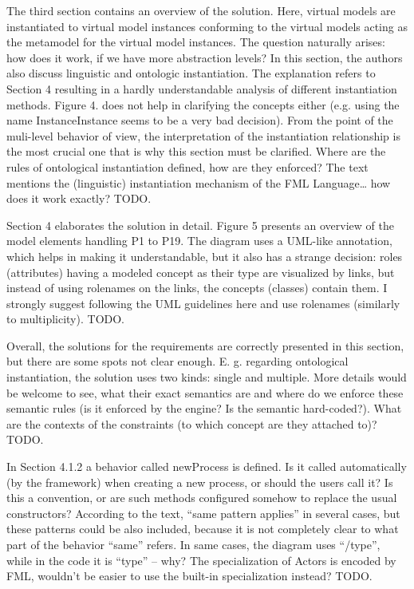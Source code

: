 \documentclass[10pt]{article}
\begin{document}
\begin{response}{The third section contains an overview of the solution. Here, virtual models are instantiated to virtual model instances conforming to the virtual models acting as the metamodel for the virtual model instances. The question naturally arises: how does it work, if we have more abstraction levels?  In this section, the authors also discuss linguistic and ontologic instantiation. The explanation refers to Section 4 resulting in a hardly understandable analysis of different instantiation methods. Figure 4. does not help in clarifying the concepts either (e.g. using the name InstanceInstance seems to be a very bad decision). From the point of the muli-level behavior of view, the interpretation of the instantiation relationship is the most crucial one that is why this section must be clarified. Where are the rules of ontological instantiation defined, how are they enforced? The text mentions the (linguistic) instantiation mechanism of the FML Language… how does it work exactly?} 
TODO.
\end{response}

\begin{response}{Section 4 elaborates the solution in detail. Figure 5 presents an overview of the model elements handling P1 to P19. The diagram uses a UML-like annotation, which helps in making it understandable, but it also has a strange decision: roles (attributes) having a modeled concept as their type are visualized by links, but instead of using rolenames on the links, the concepts (classes) contain them. I strongly suggest following the UML guidelines here and use rolenames (similarly to multiplicity).}
TODO.
\end{response}

\begin{response}{Overall, the solutions for the requirements are correctly presented in this section, but there are some spots not clear enough. E. g. regarding ontological instantiation, the solution uses two kinds: single and multiple. More details would be welcome to see, what their exact semantics are and where do we enforce these semantic rules (is it enforced by the engine? Is the semantic hard-coded?). What are the contexts of the constraints (to which concept are they attached to)?} 
TODO.
\end{response}


\begin{response}{In Section 4.1.2 a behavior called newProcess is defined. Is it called automatically (by the framework) when creating a new process, or should the users call it? Is this a convention, or are such methods configured somehow to replace the usual constructors? According to the text, “same pattern applies” in several cases, but these patterns could be also included, because it is not completely clear to what part of the behavior “same” refers. In same cases, the diagram uses “/type”, while in the code it is “type” – why? The specialization of Actors is encoded by FML, wouldn’t be easier to use the built-in specialization instead?} 
TODO.
\end{response}
\end{document}
